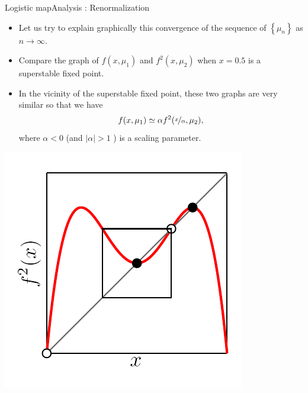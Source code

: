 \documentclass[usenames,dvipsnames,svgnames,10pt,aspectratio=169]{beamer}
\begin{document}
\begin{frame}[t, c]{Logistic map}{Analysis : Renormalization}
	\begin{minipage}{.68\textwidth}
		\begin{itemize}
			\item Let us try to explain graphically this convergence of the sequence of \( \left\{ \mu_n \right\} \) as \( n \to \infty \).

			\medskip

			\item Compare the graph of \(f(x, \mu_1)\) and \(f^2(x, \mu_2)\) when \(x = 0.5\) is a superstable fixed point.

			\medskip

			\item In the vicinity of the superstable fixed point, these two graphs are very similar so that we have
			\[
				f(x, \mu_1) \simeq \alpha f^2(\nicefrac{x}{\alpha}, \mu_2),
			\]
			where \( \alpha < 0 \) (and \( \vert \alpha \vert > 1\) ) is a scaling parameter.
		\end{itemize}
	\end{minipage}%
	\hfill
	\begin{minipage}{.28\textwidth}
		\centering
		\includegraphics[width=\textwidth]{renormalization_2}
	\end{minipage}

	\vspace{1cm}
\end{frame}
\end{document}
